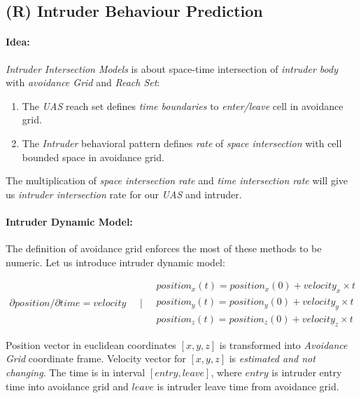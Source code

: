 \subsection{(R) Intruder Behaviour Prediction}\label{s:intruderBehaviourPrediction}
\paragraph{Idea:} \emph{Intruder Intersection Models} is about space-time intersection of \emph{intruder body} with \emph{avoidance Grid} and \emph{Reach Set}:
\begin{enumerate}
    \item The \emph{UAS} reach set defines \emph{time boundaries} to \emph{enter/leave} cell in avoidance grid.
    \item The \emph{Intruder} behavioral pattern defines \emph{rate} of \emph{space intersection} with cell bounded space in avoidance grid.
\end{enumerate}

The multiplication of \emph{space intersection rate} and \emph{time intersection rate} will give us \emph{intruder intersection} rate for our \emph{UAS} and intruder.


\paragraph{Intruder Dynamic Model:} The  definition of avoidance grid enforces the  most of these methods to be numeric. Let us introduce intruder dynamic model:

\begin{equation}\label{eq:intruderBasicLinearModel}
    \begin{aligned}
        \partial position /\partial time = velocity 
    \end{aligned}
    \quad | \quad
    \begin{aligned}
        position_x(t) = position_x(0) + velocity_x \times t\\
        position_y(t) = position_y(0) + velocity_y \times t\\
        position_z(t) = position_z(0) + velocity_z \times t
    \end{aligned}
\end{equation}

\noindent Position vector in euclidean coordinates $[x,y,z]$   is transformed into \emph{Avoidance Grid} coordinate frame. Velocity vector for $[x,y,z]$  is \emph{estimated and not changing}. The time  is in interval $[entry,leave]$, where $entry$ is intruder entry time into avoidance grid and $leave$ is intruder leave time from avoidance grid. 

